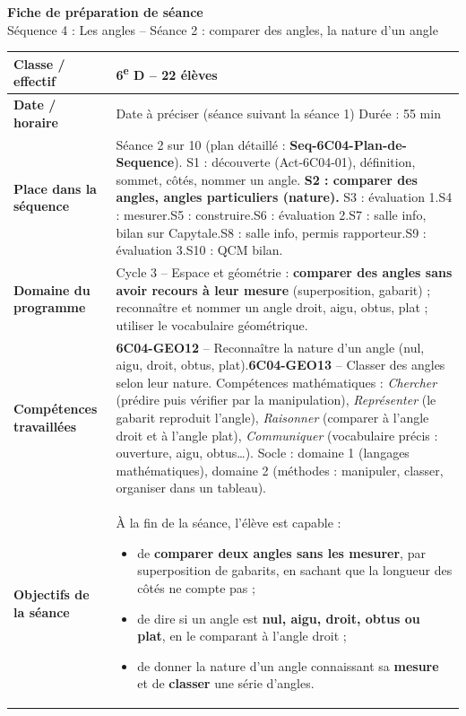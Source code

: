 \documentclass[11pt]{article}
\newcommand{\champ}[2]{\textbf{#1} & #2 \\ \hline}
\begin{document}
\begin{center}
{\Large\bfseries Fiche de préparation de séance}\\[1mm]
{\large Séquence 4 : Les angles -- Séance 2 : comparer des angles, la nature d'un angle}
\end{center}

\renewcommand{\arraystretch}{1.35}
\begin{tabularx}{\linewidth}{|>{\raggedright\arraybackslash}p{3.6cm}|X|}
\hline
\champ{Classe / effectif}{6\textsuperscript{e} D -- 22 élèves}
\champ{Date / horaire}{Date à préciser (séance suivant la séance 1) \qquad Durée : 55 min}
\champ{Place dans la séquence}{Séance 2 sur 10 (plan détaillé : \textbf{Seq-6C04-Plan-de-Sequence}).\enskip
S1 : découverte (Act-6C04-01), définition, sommet, côtés, nommer un angle.\enskip
\textbf{S2 : comparer des angles, angles particuliers (nature).}\enskip
S3 : évaluation 1.\enskip S4 : mesurer.\enskip S5 : construire.\enskip S6 : évaluation 2.\enskip S7 : salle info, bilan sur Capytale.\enskip S8 : salle info, permis rapporteur.\enskip S9 : évaluation 3.\enskip S10 : QCM bilan.}
\champ{Domaine du programme}{Cycle 3 -- Espace et géométrie : \textbf{comparer des angles sans avoir recours à leur mesure} (superposition, gabarit) ; reconnaître et nommer un angle droit, aigu, obtus, plat ; utiliser le vocabulaire géométrique.}
\champ{Compétences travaillées}{\textbf{6C04-GEO12} -- Reconnaître la nature d'un angle (nul, aigu, droit, obtus, plat).\newline \textbf{6C04-GEO13} -- Classer des angles selon leur nature.\newline
Compétences mathématiques : \textit{Chercher} (prédire puis vérifier par la manipulation), \textit{Représenter} (le gabarit reproduit l'angle), \textit{Raisonner} (comparer à l'angle droit et à l'angle plat), \textit{Communiquer} (vocabulaire précis : ouverture, aigu, obtus\ldots).\newline
Socle : domaine 1 (langages mathématiques), domaine 2 (méthodes : manipuler, classer, organiser dans un tableau).}
\champ{Objectifs de la séance}{À la fin de la séance, l'élève est capable :
\begin{itemize}[nosep,leftmargin=1.2em]
\item de \textbf{comparer deux angles sans les mesurer}, par superposition de gabarits, en sachant que la longueur des côtés ne compte pas ;
\item de dire si un angle est \textbf{nul, aigu, droit, obtus ou plat}, en le comparant à l'angle droit ;
\item de donner la nature d'un angle connaissant sa \textbf{mesure} et de \textbf{classer} une série d'angles.

\end{itemize}}
\end{tabularx}
\end{document}
